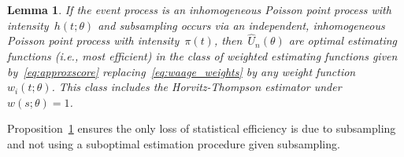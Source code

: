 \documentclass[12pt]{amsart}
\newtheorem{lemma}[thm]{Lemma}
\newtheorem{prop}[thm]{Proposition}
\begin{document}
\begin{lemma} \normalfont
\label{prop:optimal}
If the event process is an inhomogeneous Poisson point process with intensity~$h(t; \theta)$ and subsampling occurs via an independent, inhomogeneous Poisson point process with intensity~$\pi (t)$, then~$\hat U_n (\theta)$ are optimal estimating functions (i.e., most efficient) in the class of weighted estimating functions given by~\eqref{eq:approxscore} replacing~\eqref{eq:waage_weights} by any weight function~$w_i (t; \theta)$. This class includes the Horvitz-Thompson estimator under~$w(s; \theta) = 1$.
\end{lemma}

\noindent Proposition~\ref{prop:optimal} ensures the only loss of statistical efficiency is due to subsampling and not using a suboptimal estimation procedure given subsampling.




\end{document}
